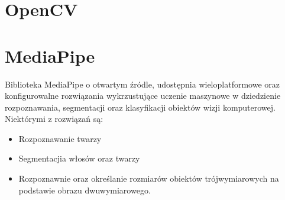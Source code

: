 






\section{OpenCV}

\section{MediaPipe}

\quad Biblioteka MediaPipe o otwartym źródle, udostępnia wieloplatformowe oraz konfigurowalne rozwiązania wykrzustujące uczenie maszynowe w dziedzienie rozpoznawania, segmentacji oraz klasyfikacji obiektów wizji komputerowej. Niektórymi z rozwiązań są:

\begin{itemize}
    \item Rozpoznawanie twarzy
    \item Segmentacjia włosów oraz twarzy
    \item Rozpoznawnie oraz określanie rozmiarów obiektów trójwymiarowych 
            na podstawie obrazu dwuwymiarowego. 
\end{itemize}

